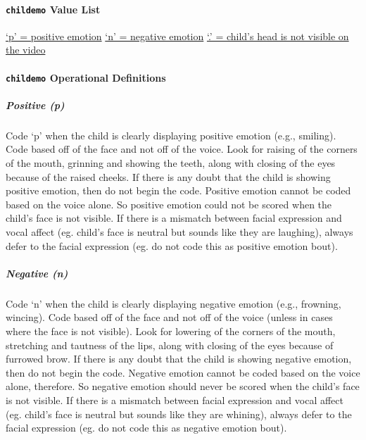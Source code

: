 \documentclass[
  12pt,
]{book}
\begin{document}
\hypertarget{childemo-value-list}{%
\paragraph*{\texorpdfstring{\texttt{childemo} Value List}{childemo Value List}}\label{childemo-value-list}}

\protect\hyperlink{child_pos_emo}{`p' = positive emotion}
\protect\hyperlink{child_neg_emo}{`n' = negative emotion}
\protect\hyperlink{child_head_not_visible}{`.' = child's head is not visible on the video}

\hypertarget{childemo-operational-definitions}{%
\paragraph*{\texorpdfstring{\texttt{childemo} Operational Definitions}{childemo Operational Definitions}}\label{childemo-operational-definitions}}

\hypertarget{child_pos_emo}{%
\subparagraph*{Positive (p)}\label{child_pos_emo}}

Code `p' when the child is clearly displaying positive emotion (e.g., smiling). Code based off of the face and not off of the voice. Look for raising of the corners of the mouth, grinning and showing the teeth, along with closing of the eyes because of the raised cheeks. If there is any doubt that the child is showing positive emotion, then do not begin the code.
Positive emotion cannot be coded based on the voice alone. So positive emotion could not be scored when the child's face is not visible. If there is a mismatch between facial expression and vocal affect (eg. child's face is neutral but sounds like they are laughing), always defer to the facial expression (eg. do not code this as positive emotion bout).

\hypertarget{child_neg_emo}{%
\subparagraph*{Negative (n)}\label{child_neg_emo}}

Code `n' when the child is clearly displaying negative emotion (e.g., frowning, wincing). Code based off of the face and not off of the voice (unless in cases where the face is not visible). Look for lowering of the corners of the mouth, stretching and tautness of the lips, along with closing of the eyes because of furrowed brow. If there is any doubt that the child is showing negative emotion, then do not begin the code.
Negative emotion cannot be coded based on the voice alone, therefore. So negative emotion should never be scored when the child's face is not visible. If there is a mismatch between facial expression and vocal affect (eg. child's face is neutral but sounds like they are whining), always defer to the facial expression (eg. do not code this as negative emotion bout).
\end{document}
